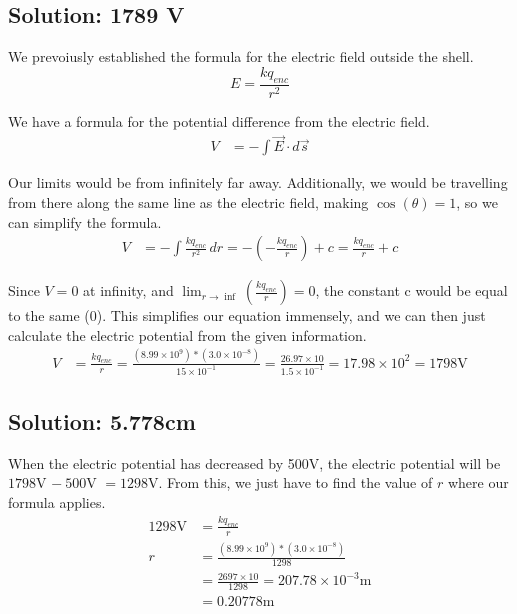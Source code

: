 \documentclass[12pt]{article}
\begin{document}
\subsection{Solution: 1789 V}
We prevoiusly established the formula for the electric field outside the shell.
\begin{equation*}
    E = \frac{kq_{enc}}{r^2}
\end{equation*}

We have a formula for the potential difference from the electric field.
\begin{align*}
    V   &=  -\int \vec{E}\cdot d\vec{s}
\end{align*}

Our limits would be from infinitely far away. 
Additionally, we would be travelling from there along the same line as the electric field, making $\cos(\theta) = 1$, so we can simplify the formula. 
\begin{align*}
    V   &=  -\int \frac{kq_{enc}}{r^2} \,dr
        =   -\left(-\frac{kq_{enc}}{r}\right) + c
        =   \frac{kq_{enc}}{r} + c
\end{align*}

Since $V = 0$ at infinity, and \(\lim_{r \to \inf}\left(\frac{kq_{enc}}{r}\right) = 0\), the constant c would be equal to the same (0).
This simplifies our equation immensely, and we can then just calculate the electric potential from the given information.
\begin{align*}
    V   &=  \frac{kq_{enc}}{r}
        =   \frac{(8.99 \times 10^9)*(3.0 \times 10^{-8})}{15 \times 10^{-1}}
        =   \frac{26.97 \times 10}{1.5 \times 10^{-1}}
        =   17.98 \times 10^2 
        =   \boxed{1798 \unit{\volt}}
\end{align*}

\subsection{Solution: 5.778cm}
When the electric potential has decreased by 500V, the electric potential will be $1798$V $-\ 500$V $= 1298$V. 
From this, we just have to find the value of $r$ where our formula applies.
\begin{align*}
    1298 \unit{\volt}   &=  \frac{kq_{enc}}{r}\\
    r   &=  \frac{(8.99 \times 10^9)*(3.0 \times 10^{-8})}{1298}\\
        &=  \frac{2697 \times 10}{1298}
        =   207.78 \times 10^{-3} \unit{\meter}\\
        &=  0.20778 \unit{\meter}
\end{align*}
\end{document}
